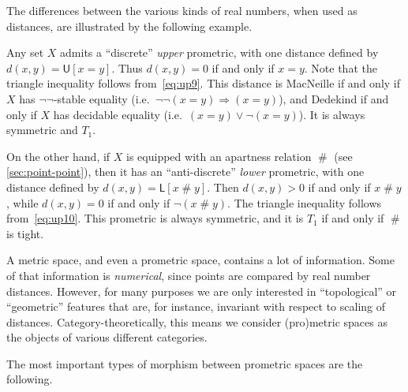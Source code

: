 \documentclass{article}
\def\U[#1]{\mathsf{U}[#1]}
\def\L[#1]{\mathsf{L}[#1]}
\def\apart{\mathrel{\#}}
\let\implies\Rightarrow
\def\nn{\ensuremath{\neg\neg}}
\begin{document}
The differences between the various kinds of real numbers, when used as distances, are illustrated by the following example.

\begin{eg}
  Any set $X$ admits a ``discrete'' \emph{upper} prometric, with one distance defined by
  \( d(x,y) = \U[x=y] \).
  Thus $d(x,y)=0$ if and only if $x=y$.
  Note that the triangle inequality follows from~\eqref{eq:up9}.
  This distance is MacNeille if and only if $X$ has \nn-stable equality (i.e.\ $\neg\neg(x=y)\implies (x=y)$), and Dedekind if and only if $X$ has decidable equality (i.e.\ $(x=y)\lor \neg(x=y)$).
  It is always symmetric and $T_1$.

  On the other hand, if $X$ is equipped with an apartness relation $\apart$ (see \cref{sec:point-point}), then it has an ``anti-discrete'' \emph{lower} prometric, with one distance defined by
  \( d(x,y) = \L[x\apart y] \).
  Then $d(x,y)>0$ if and only if $x\apart y$, while $d(x,y)=0$ if and only if $\neg(x\apart y)$.
  The triangle inequality follows from~\eqref{eq:up10}.
  This prometric is always symmetric, and it is $T_1$ if and only if $\apart$ is tight.
\end{eg}

A metric space, and even a prometric space, contains a lot of information.
Some of that information is \emph{numerical}, since points are compared by real number distances.
However, for many purposes we are only interested in ``topological'' or ``geometric'' features that are, for instance, invariant with respect to scaling of distances.
Category-theoretically, this means we consider (pro)metric spaces as the objects of various different categories.

The most important types of morphism between prometric spaces are the following.
\end{document}
